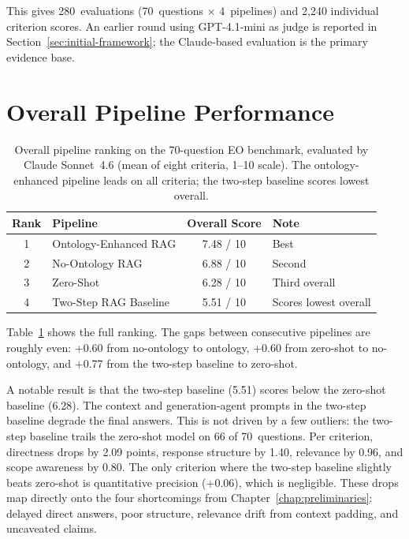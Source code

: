 This gives 280~evaluations (70~questions $\times$ 4~pipelines) and 2{,}240 individual criterion scores. An earlier round using GPT-4.1-mini as judge is reported in Section~\ref{sec:initial-framework}; the Claude-based evaluation is the primary evidence base.

\section{Overall Pipeline Performance}
\label{sec:overall-performance}

\begin{table}[htbp]
\centering
\caption{Overall pipeline ranking on the 70-question EO benchmark, evaluated
by Claude Sonnet~4.6 (mean of eight criteria, 1--10 scale). The ontology-enhanced
pipeline leads on all criteria; the two-step baseline scores lowest overall.}
\label{tab:overall-ranking}
\begin{tabular}{clcl}
\toprule
\textbf{Rank} & \textbf{Pipeline} & \textbf{Overall Score} & \textbf{Note} \\
\midrule
1 & Ontology-Enhanced RAG & 7.48 / 10 & Best \\
2 & No-Ontology RAG & 6.88 / 10 & Second \\
3 & Zero-Shot & 6.28 / 10 & Third overall \\
4 & Two-Step RAG Baseline & 5.51 / 10 & Scores lowest overall \\
\bottomrule
\end{tabular}
\end{table}

Table~\ref{tab:overall-ranking} shows the full ranking. The gaps between consecutive pipelines are roughly even: +0.60 from no-ontology to ontology, +0.60 from zero-shot to no-ontology, and +0.77 from the two-step baseline to zero-shot.

A notable result is that the two-step baseline (5.51) scores below the zero-shot baseline (6.28). The context and generation-agent prompts in the two-step baseline degrade the final answers. This is not driven by a few outliers: the two-step baseline trails the zero-shot model on 66 of 70~questions. Per criterion, directness drops by 2.09 points, response structure by 1.40, relevance by 0.96, and scope awareness by 0.80. The only criterion where the two-step baseline slightly beats zero-shot is quantitative precision (+0.06), which is negligible. These drops map directly onto the four shortcomings from Chapter~\ref{chap:preliminaries}: delayed direct answers, poor structure, relevance drift from context padding, and uncaveated claims.

